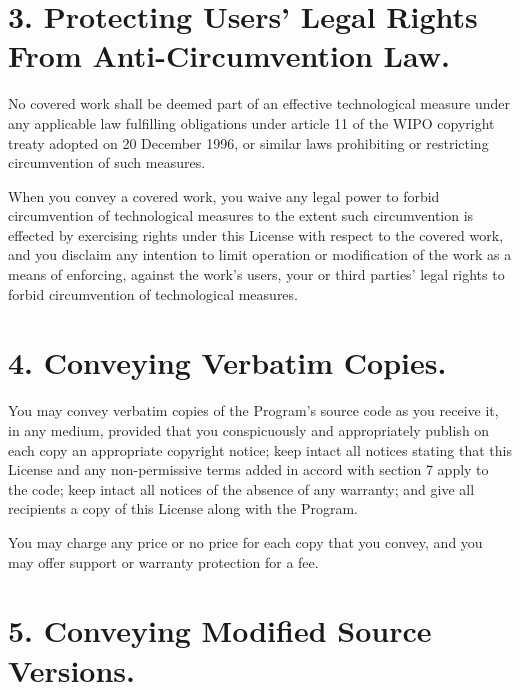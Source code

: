\documentclass[11pt,a4paper]{article}
\begin{document}
\part*{3. Protecting Users' Legal Rights From Anti-Circumvention Law.}

No covered work shall be deemed part of an effective technological
measure under any applicable law fulfilling obligations under article 11
of the WIPO copyright treaty adopted on 20 December 1996, or similar
laws prohibiting or restricting circumvention of such measures.

When you convey a covered work, you waive any legal power to forbid
circumvention of technological measures to the extent such circumvention
is effected by exercising rights under this License with respect to the
covered work, and you disclaim any intention to limit operation or
modification of the work as a means of enforcing, against the work's
users, your or third parties' legal rights to forbid circumvention of
technological measures.

\part*{4. Conveying Verbatim Copies.}

You may convey verbatim copies of the Program's source code as you
receive it, in any medium, provided that you conspicuously and
appropriately publish on each copy an appropriate copyright notice; keep
intact all notices stating that this License and any non-permissive
terms added in accord with section 7 apply to the code; keep intact all
notices of the absence of any warranty; and give all recipients a copy
of this License along with the Program.

You may charge any price or no price for each copy that you convey, and
you may offer support or warranty protection for a fee.

\part*{5. Conveying Modified Source Versions.}
\end{document}

